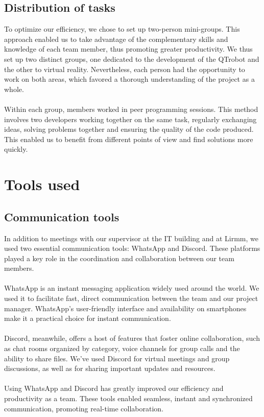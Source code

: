 \newpage
\subsection{Distribution of tasks}
To optimize our efficiency, we chose to set up two-person mini-groups. This approach enabled us to take advantage of the complementary skills and knowledge of each team member, thus promoting greater productivity.
We thus set up two distinct groups, one dedicated to the development of the QTrobot and the other to virtual reality. Nevertheless, each person had the opportunity to work on both areas, which favored a thorough understanding of the project as a whole. \\
\\
Within each group, members worked in peer programming sessions. This method involves two developers working together on the same task, regularly exchanging ideas, solving problems together and ensuring the quality of the code produced. This enabled us to benefit from different points of view and find solutions more quickly.

\section{Tools used}
\subsection{Communication tools}
In addition to meetings with our supervisor at the IT building and at Lirmm, we used two essential communication tools: WhatsApp and Discord. These platforms played a key role in the coordination and collaboration between our team members.\\
\\
WhatsApp is an instant messaging application widely used around the world. We used it to facilitate fast, direct communication between the team and our project manager. WhatsApp's user-friendly interface and availability on smartphones make it a practical choice for instant communication.\\
\\
Discord, meanwhile, offers a host of features that foster online collaboration, such as chat rooms organized by category, voice channels for group calls and the ability to share files. We've used Discord for virtual meetings and group discussions, as well as for sharing important updates and resources. \\
\\
Using WhatsApp and Discord has greatly improved our efficiency and productivity as a team. These tools enabled seamless, instant and synchronized communication, promoting real-time collaboration. \\

